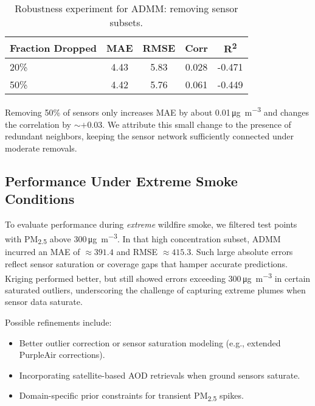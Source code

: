 \documentclass[12pt]{article}                                %
\begin{document}
\begin{table}[!ht]
\centering
\caption{Robustness experiment for ADMM: removing sensor subsets.}
\label{tab:robustnessResults}
\begin{tabular}{lcccc}
\toprule
Fraction Dropped & MAE & RMSE & Corr & R\textsuperscript{2} \\
\midrule
20\% & 4.43 & 5.83 & 0.028 & -0.471 \\
50\% & 4.42 & 5.76 & 0.061 & -0.449 \\
\bottomrule
\end{tabular}
\end{table}

Removing 50\% of sensors only increases MAE by about 0.01\,\si{\micro\gram\per\cubic\meter} 
and changes the correlation by $\sim +0.03$. We attribute this small change to the presence 
of redundant neighbors, keeping the sensor network sufficiently connected under moderate 
removals.

\subsection{Performance Under Extreme Smoke Conditions}
\label{sec:extremeSmoke}    %

To evaluate performance during \textit{extreme} wildfire smoke, we filtered test points 
with PM\textsubscript{2.5} above 300\,\si{\micro\gram\per\cubic\meter}. In that high 
concentration subset, ADMM incurred an MAE of $\approx391.4$ and RMSE $\approx415.3$. Such 
large absolute errors reflect sensor saturation or coverage gaps that hamper accurate 
predictions. Kriging performed better, but still showed errors exceeding 
300\,\si{\micro\gram\per\cubic\meter} in certain saturated outliers, underscoring the 
challenge of capturing extreme plumes when sensor data saturate.

Possible refinements include:
\begin{itemize}
    \item Better outlier correction or sensor saturation modeling (e.g., extended PurpleAir corrections).
    \item Incorporating satellite-based AOD retrievals when ground sensors saturate.
    \item Domain-specific prior constraints for transient PM\textsubscript{2.5} spikes.
\end{itemize}
\end{document}
